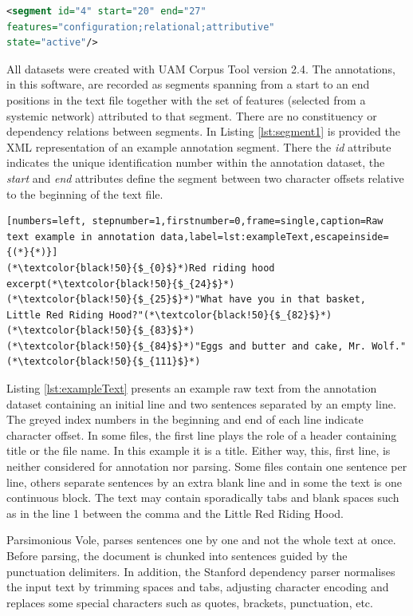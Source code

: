 \begin{lstlisting}[language=XML,frame=single,caption=Segment example in UAM corpus tool,label=lst:segment1]
<segment id="4" start="20" end="27" 
features="configuration;relational;attributive" 
state="active"/>
\end{lstlisting}

All datasets were created with UAM Corpus Tool \citep{ODonnell2008,ODonnell2008a} version 2.4. The annotations, in this software, are recorded as segments spanning from a start to an end positions in the text file together with the set of features (selected from a systemic network) attributed to that segment. There are no constituency or dependency relations between segments. In Listing \ref{lst:segment1} is provided the XML representation of an example annotation segment. There the \textit{id} attribute indicates the unique identification number within the annotation dataset, the \textit{start} and \textit{end} attributes define the segment between two character offsets relative to the beginning of the text file. 

\begin{lstlisting}[numbers=left, stepnumber=1,firstnumber=0,frame=single,caption=Raw text example in annotation data,label=lst:exampleText,escapeinside={(*}{*)}]
(*\textcolor{black!50}{$_{0}$}*)Red riding hood excerpt(*\textcolor{black!50}{$_{24}$}*)
(*\textcolor{black!50}{$_{25}$}*)"What have you in that basket,   Little Red Riding Hood?"(*\textcolor{black!50}{$_{82}$}*)
(*\textcolor{black!50}{$_{83}$}*)
(*\textcolor{black!50}{$_{84}$}*)"Eggs and butter and cake, Mr. Wolf."(*\textcolor{black!50}{$_{111}$}*)
\end{lstlisting}

Listing \ref{lst:exampleText} presents an example raw text from the annotation dataset containing an initial line and two sentences separated by an empty line. The greyed index numbers in the beginning and end of each line indicate character offset. In some files, the first line plays the role of a header containing title or the file name. In this example it is a title. Either way, this, first line, is neither considered for annotation nor parsing. Some files contain one sentence per line, others separate sentences by an extra blank line and in some the text is one continuous block. The text may  contain sporadically tabs and blank spaces such as in the line 1 between the comma and the Little Red Riding Hood. 

Parsimonious Vole, parses sentences one by one and not the whole text at once. Before parsing, the document is chunked into sentences guided by the punctuation delimiters. In addition, the Stanford dependency parser normalises the input text by trimming spaces and tabs, adjusting character encoding and replaces some special characters such as quotes, brackets, punctuation, etc.

